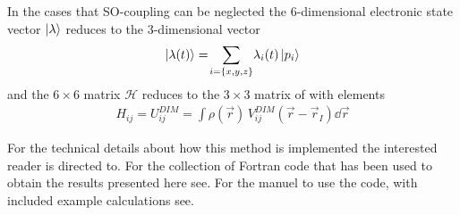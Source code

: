 			In the cases that SO-coupling can be neglected the 6-dimensional electronic state vector $\ket{\lambda}$ reduces to the 3-dimensional vector
			\begin{align}
				\ket{\lambda(t)} = \!\sum_{i=\{x,y,z\}} \!\lambda_{i}(t) \ket{p_i}
			\end{align}
			and the $6\times6$ matrix $\mathcal{H}$ reduces to the $3\times 3$ matrix of  with elements
			\begin{align}
				H_{ij} = U^{DIM}_{ij} = \int\!\rho(\vec{r})\,V^{DIM}_{ij}(\vec{r}-\vec{r}_I)\dd{\vec{r}}
			\end{align}
			
			For the technical details about how this method is implemented the interested reader is directed to. For the collection of Fortran code that has been used to obtain the results presented here see. For the manuel to use the code, with included example calculations see.
